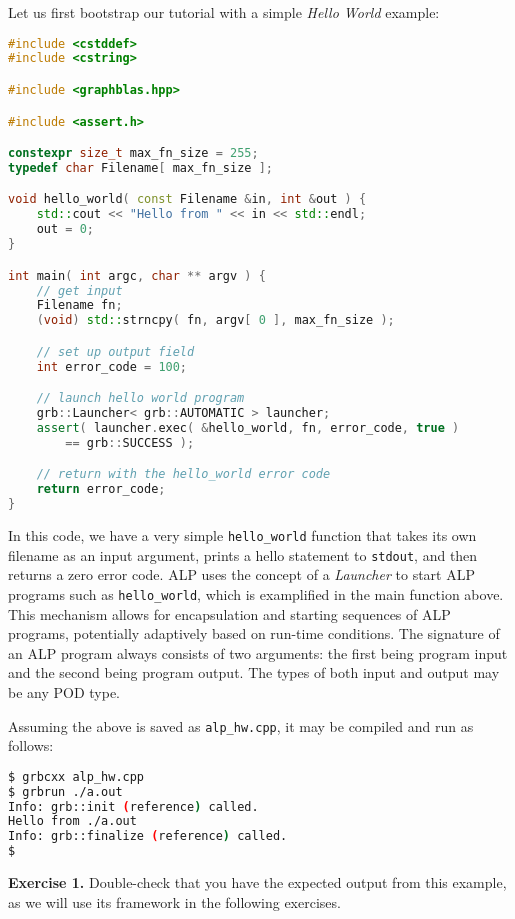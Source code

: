 Let us first bootstrap our tutorial with a simple \emph{Hello World} example:

\begin{lstlisting}[language=c++,morekeywords=constexpr,morekeywords=size_t]
#include <cstddef>
#include <cstring>

#include <graphblas.hpp>

#include <assert.h>

constexpr size_t max_fn_size = 255;
typedef char Filename[ max_fn_size ];

void hello_world( const Filename &in, int &out ) {
	std::cout << "Hello from " << in << std::endl;
	out = 0;
}

int main( int argc, char ** argv ) {
	// get input
	Filename fn;
	(void) std::strncpy( fn, argv[ 0 ], max_fn_size );

	// set up output field
	int error_code = 100;

	// launch hello world program
	grb::Launcher< grb::AUTOMATIC > launcher;
	assert( launcher.exec( &hello_world, fn, error_code, true )
		== grb::SUCCESS );

	// return with the hello_world error code
	return error_code;
}
\end{lstlisting}

In this code, we have a very simple \texttt{hello\_world} function that takes its own filename as an input argument, prints a hello statement to \texttt{stdout}, and then returns a zero error code.
ALP uses the concept of a \emph{Launcher} to start ALP programs such as \texttt{hello\_world}, which is examplified in the main function above. This mechanism allows for encapsulation and starting sequences of ALP programs, potentially adaptively based on run-time conditions. The signature of an ALP program always consists of two arguments: the first being program input and the second being program output. The types of both input and output may be any POD type.

Assuming the above is saved as \texttt{alp\_hw.cpp}, it may be compiled and run as follows:
\begin{lstlisting}[language=bash]
$ grbcxx alp_hw.cpp
$ grbrun ./a.out
Info: grb::init (reference) called.
Hello from ./a.out
Info: grb::finalize (reference) called.
$ 
\end{lstlisting}

\noindent \textbf{Exercise 1.} Double-check that you have the expected output from this example, as we will use its framework in the following exercises.

